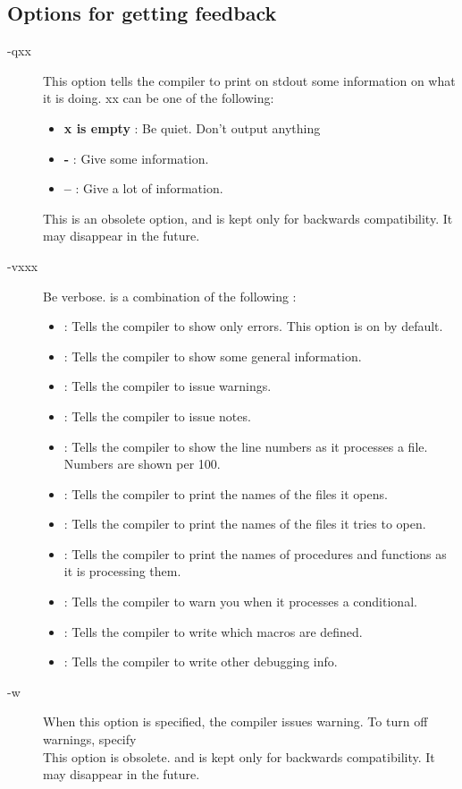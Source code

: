 \documentclass{report}
\newcommand{\olabel}[1]{\label{option:#1}}
\begin{document}
\subsection{Options for getting feedback}
\begin{description}
\item[-qxx] This option tells the compiler to print on stdout some
information on what it is doing. xx can be one of the following:
\olabel{q}
\begin{itemize}
\item \textbf{x is empty} : Be quiet. Don't output anything
\item \textbf{-} : Give some information.
\item \textbf{--} : Give a lot of information.
\end{itemize}
This is an obsolete option, and is kept only for backwards
compatibility. It may disappear in the future.\\
\item[-vxxx] Be verbose.  is a combination of the following :
\olabel{v}
\begin{itemize}
\item {} : Tells the compiler to show only errors. This option is on by default.
\item {} : Tells the compiler to show some general information.
\item {} : Tells the compiler to issue warnings.
\item {} : Tells the compiler to issue notes.
\item {} : Tells the compiler to show the line numbers as it processes a
file. Numbers are shown per 100.
\item {} : Tells the compiler to print the names of the files it opens.
\item {} : Tells the compiler to print the names of the files it tries
to open. 
\item {} : Tells the compiler to print the names of procedures and
functions as it is processing them.
\item {} : Tells the compiler to warn you when it processes a
conditional.
\item {} : Tells the compiler to write which macros are defined.
\item {} : Tells the compiler to write other debugging info.
\end{itemize}
\item[-w] When this option is specified, the compiler issues warning. To
turn off warnings, specify \\
This option is obsolete. and is kept only for backwards compatibility. It
may disappear in the future.
\olabel{w}
\end{description}
\end{document}
